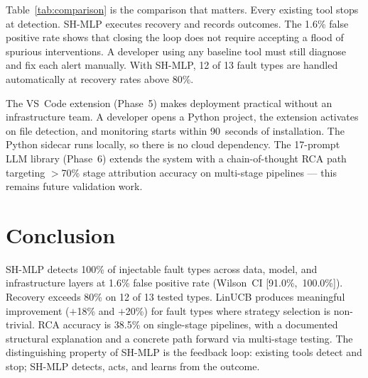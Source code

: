 \documentclass[conference]{IEEEtran}
\begin{document}
Table~\ref{tab:comparison} is the comparison that matters. Every existing tool
stops at detection. SH-MLP executes recovery and records outcomes. The 1.6\%
false positive rate shows that closing the loop does not require accepting a
flood of spurious interventions. A developer using any baseline tool must still
diagnose and fix each alert manually. With SH-MLP, 12 of 13 fault types are
handled automatically at recovery rates above 80\%.

The VS~Code extension (Phase~5) makes deployment practical without an
infrastructure team. A developer opens a Python project, the extension
activates on file detection, and monitoring starts within 90~seconds of
installation. The Python sidecar runs locally, so there is no cloud dependency.
The 17-prompt LLM library (Phase~6) extends the system with a chain-of-thought
RCA path targeting $>$70\% stage attribution accuracy on multi-stage pipelines
--- this remains future validation work.

\section{Conclusion}

SH-MLP detects 100\% of injectable fault types across data, model, and
infrastructure layers at 1.6\% false positive rate (Wilson~CI
[91.0\%,~100.0\%]). Recovery exceeds 80\% on 12 of 13 tested types. LinUCB
produces meaningful improvement ($+$18\% and $+$20\%) for fault types where
strategy selection is non-trivial. RCA accuracy is 38.5\% on single-stage
pipelines, with a documented structural explanation and a concrete path forward
via multi-stage testing. The distinguishing property of SH-MLP is the feedback
loop: existing tools detect and stop; SH-MLP detects, acts, and learns from
the outcome.
\end{document}
